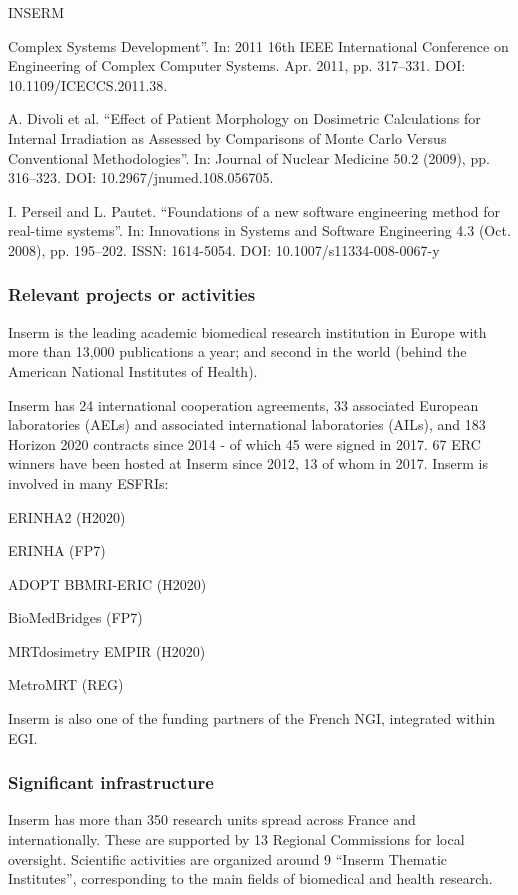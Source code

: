 \begin{sitedescription}{INSERM}
\begin{compactenum}
  Complex Systems Development”. In: 2011 16th IEEE International Conference on
  Engineering of Complex Computer Systems. Apr. 2011, pp. 317--331. DOI:
  10.1109/ICECCS.2011.38.
\item  A. Divoli et al. “Effect of Patient Morphology on Dosimetric
  Calculations for Internal Irradiation as Assessed by Comparisons of Monte
  Carlo Versus Conventional Methodologies”. In: Journal of Nuclear Medicine
  50.2 (2009), pp. 316--323. DOI: 10.2967/jnumed.108.056705.
\item I. Perseil and L. Pautet. “Foundations of a new software engineering
  method for real-time systems”. In: Innovations in Systems and Software
  Engineering 4.3 (Oct. 2008), pp. 195--202. ISSN: 1614-5054. DOI:
  10.1007/s11334-008-0067-y
\end{compactenum}

\subsubsection*{Relevant projects or activities}
Inserm is the leading academic biomedical research institution in Europe with
more than 13,000 publications a year; and second in the world (behind the
American National Institutes of Health).

Inserm has 24 international cooperation agreements, 33 associated European
laboratories (AELs) and associated international laboratories (AILs), and 183
Horizon 2020 contracts since 2014 - of which 45 were signed in 2017. 67 ERC
winners have been hosted at Inserm since 2012, 13 of whom in 2017.  Inserm is
involved in many ESFRIs:
\begin{compactenum}
\item ERINHA2 (H2020)
\item ERINHA (FP7)
\item ADOPT BBMRI-ERIC (H2020)
\item BioMedBridges (FP7)
\item MRTdosimetry EMPIR (H2020)
\item MetroMRT (REG)
\end{compactenum}
Inserm is also one of the funding partners of the French NGI, integrated within
EGI.

\subsubsection*{Significant infrastructure}
Inserm has more than 350 research units spread across France and
internationally. These are supported by 13 Regional Commissions for local
oversight. Scientific activities are organized around 9 “Inserm Thematic
Institutes”, corresponding to the main fields of biomedical and health
research.

\end{sitedescription}
